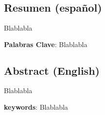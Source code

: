 \chapter*{}

\section*{Resumen (español)}
Blablabla

\textbf{Palabras Clave}: Blablabla
\newpage

\section*{Abstract (English)}
\begin{otherlanguage}{british}
Blablabla
\end{otherlanguage}

\textbf{keywords}: Blablabla
